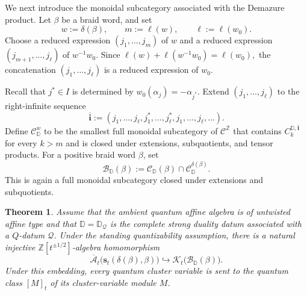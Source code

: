\documentclass[12pt, reqno]{amsart}
\theoremstyle{plain}
\newtheorem{theorem}{Theorem}[section]
\theoremstyle{definition}
\numberwithin{equation}{section}
\newcommand{\ZZ}{\mathbb{Z}}
\newcommand{\DD}{\mathbb{D}}
\begin{document}
We next introduce the monoidal subcategory associated with the
Demazure product. Let \(\beta\) be a braid word, and set
\begin{equation*}
    w:=\delta(\beta),\qquad
    m:=\ell(w),\qquad
    \ell:=\ell(w_0).
\end{equation*}
Choose a reduced expression \((j_1,\ldots,j_m)\) of \(w\) and a
reduced expression \((j_{m+1},\ldots,j_\ell)\) of \(w^{-1}w_0\).
Since
\(
    \ell(w)+\ell(w^{-1}w_0)=\ell(w_0),
\)
the concatenation
\((j_1,\ldots,j_\ell)\) is a reduced expression of \(w_0\).

Recall that \(j^*\in I\) is determined by
\(w_0(\alpha_j)=-\alpha_{j^*}\). Extend
\((j_1,\ldots,j_\ell)\) to the right-infinite sequence
\begin{equation}\label{eq:periodic-w0-sequence}
    \overline{\mathbf i}
    :=
    (j_1,\ldots,j_\ell,
     j_1^*,\ldots,j_\ell^*,
     j_1,\ldots,j_\ell,\ldots).
\end{equation}
Define \(\mathscr C_{\DD}^{w}\) to be the smallest full monoidal
subcategory of \(\mathscr C^{\ZZ}\) that contains
\(C_k^{\DD,\overline{\mathbf i}}\) for every \(k>m\) and is closed
under extensions, subquotients, and tensor products.
For a positive braid word \(\beta\), set
\begin{equation}\label{eq:B-D-beta-category}
    \mathscr B_{\DD}(\beta)
    :=
    \mathscr C_{\DD}(\beta)
    \cap
    \mathscr C_{\DD}^{\delta(\beta)}.
\end{equation}
This is again a full monoidal subcategory closed under extensions and
subquotients.

\begin{theorem}\label{thm:quantum-braid-seed-embedding}
Assume that the ambient quantum affine algebra is of untwisted affine
type and that \(\DD=\DD_{\mathcal Q}\) is the complete strong duality
datum associated with a \(Q\)-datum \(\mathcal Q\). Under the standing quantizability assumption, there is
a natural injective \(\ZZ[t^{\pm1/2}]\)-algebra homomorphism
\begin{equation}\label{eq:quantum-braid-seed-embedding}
    \overline{\mathcal A}_t
    \bigl(\mathbf s_t(\delta(\beta),\beta)\bigr)
    \hookrightarrow
    \mathcal{K}_t\bigl(\mathscr B_{\DD}(\beta)\bigr).
\end{equation}
Under this embedding, every quantum cluster variable is sent to the
quantum class \([M]_t\) of its cluster-variable module \(M\).
\end{theorem}
\end{document}
